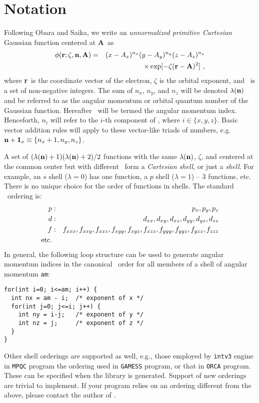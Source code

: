 \documentclass[12pt]{article}
\begin{document}
\section{\label{sec:notation} Notation}

Following Obara and Saika,\cite{Obara86}
we write an {\em unnormalized primitive Cartesian} Gaussian function centered at {\bf A}\ as
\begin{eqnarray}
\phi ({\bf r}; \zeta, {\bf n}, {\bf A}) & = & (x - A_x)^{n_x} (y - A_y)^{n_y} (z - A_z)^{n_z} \nonumber \\
& & \times \exp [-\zeta({\bf r}-{\bf A})^2]\ ,
\end{eqnarray}
where {\bf r}\ is the coordinate vector of the electron, $\zeta$ is the orbital exponent, and
\n\ is a set of non-negative integers. The sum of $n_x$, $n_y$, and $n_z$ will be denoted $\lambda({\bf n})$
and be referred to as the angular momentum or orbital quantum number of the Gaussian function.
Hereafter \n\ will be termed the angular momentum index.
Henceforth, $n_i$ will refer to the $i$-th component of \n, where $i \in \{x, y, z\}$.
Basic vector addition rules will apply to these vector-like triads of numbers, e.g.
${\bf n} + {\bf 1}_x \equiv \{ n_x+1, n_y, n_z\}$.

A set of $(\lambda({\bf n}) + 1)(\lambda({\bf n}) + 2)/2$ functions with the same $\lambda({\bf n})$, $\zeta$, and centered
at the common center
but with different \n\ form a {\em Cartesian shell},
or just a {\em shell}. For example, an $s$ shell ($\lambda=0$) has one function, a $p$ shell ($\lambda=1$) --
3 functions, etc.
There is no unique choice for the order of functions in shells.
The standard \LIBINT\ ordering is:
\begin{eqnarray}
p & : & p_x, p_y, p_z \nonumber \\
d & : & d_{xx}, d_{xy}, d_{xz}, d_{yy}, d_{yz}, d_{zz} \nonumber \\
f & : & f_{xxx}, f_{xxy}, f_{xxz}, f_{xyy}, f_{xyz}, f_{xzz}, f_{yyy}, f_{yyz}, f_{yzz}, f_{zzz} \nonumber \\
{\rm etc.} \nonumber
\end{eqnarray}
In general, the following loop structure can be used to generate angular momentum indices in the canonical \LIBINT\ order for all
members of a shell of angular momentum {\tt am}:
\begin{verbatim}
for(int i=0; i<=am; i++) {
  int nx = am - i;  /* exponent of x */
  for(int j=0; j<=i; j++) {
    int ny = i-j;   /* exponent of y */
    int nz = j;     /* exponent of z */
  }
}
\end{verbatim}
Other shell orderings are supported as well, e.g., those employed by {\tt intv3} engine in {\tt MPQC} program
the ordering used in {\tt GAMESS} program, or that in {\tt ORCA} program. These
can be specified when the library is generated. Support of new orderings are trivial to implement. If your program relies on an ordering different from the
above, please contact the author of \LIBINT .
\end{document}

